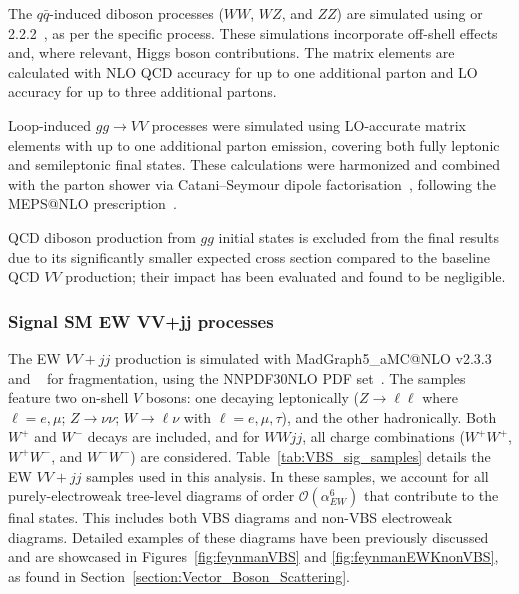 The $q\bar{q}$-induced diboson processes ($WW$, $WZ$, and $ZZ$) are simulated using \SHERPA[2.2.1] or 2.2.2~\cite{Bothmann:2019yzt}, as per the specific process. 
These simulations incorporate off-shell effects and, where relevant, Higgs boson contributions. 
The matrix elements are calculated with NLO QCD accuracy for up to one additional parton and LO accuracy for up to three additional partons.

Loop-induced $gg \to VV$ processes were simulated using LO-accurate matrix elements with up to one additional parton emission, covering both fully leptonic and semileptonic final states. These calculations were harmonized and combined with the \SHERPA parton shower via Catani--Seymour dipole factorisation~\cite{Gleisberg:2008fv,Schumann:2007mg}, following the MEPS@NLO prescription~\cite{Hoeche:2011fd,Hoeche:2012yf,Catani:2001cc,Hoeche:2009rj}.

QCD diboson production from $gg$ initial states is excluded from the final results due to its significantly smaller expected cross section compared to the baseline QCD $VV$ production; their impact has been evaluated and found to be negligible.


\subsubsection{Signal SM EW VV+jj processes}
\label{sec:mc_sample_ewvvjj}

The EW $VV+jj$ production is simulated with MadGraph5\_aMC@NLO v2.3.3~\cite{Alwall:2014hca} and ~\cite{Sjostrand:2007gs} for fragmentation, using the \textsc{NNPDF30NLO} PDF set~\cite{Ball:2012cx}. 
The samples feature two on-shell $V$ bosons: one decaying leptonically ($Z \to \ell\ell$ where $\ell = e, \mu$; $Z \to \nu\nu$; $W \to \ell \nu$ with $\ell= e, \mu, \tau$), and the other hadronically. 
Both $W^{+}$ and $W^{-}$ decays are included, and for $WWjj$, all charge combinations ($W^{+}W^{+}$, $W^{+}W^{-}$, and $W^{-}W^{-}$) are considered. 
Table~\ref{tab:VBS_sig_samples} details the EW $VV+jj$ samples used in this analysis.
In these samples, we account for all purely-electroweak tree-level diagrams of order $\mathcal{O}(\alpha_{EW}^6)$ that contribute to the final states. This includes both VBS diagrams and non-VBS electroweak diagrams. Detailed examples of these diagrams have been previously discussed and are showcased in Figures~\ref{fig:feynmanVBS} and \ref{fig:feynmanEWKnonVBS}, as found in Section~\ref{section:Vector_Boson_Scattering}.


